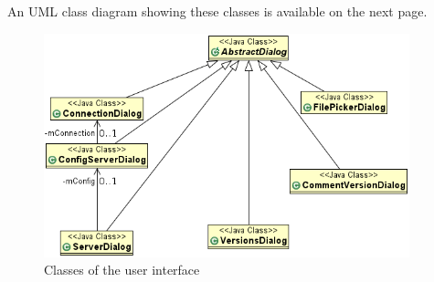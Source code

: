 An UML class diagram showing these classes is available on the next page.

\begin{figure}[p]
\centering
\includegraphics[width=400px,keepaspectratio]{design-spui.png}
\caption{Classes of the user interface}
\end{figure}
